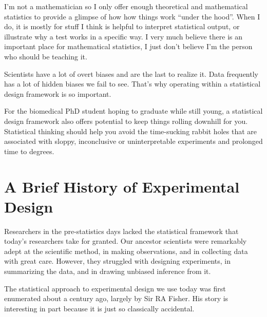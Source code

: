 \documentclass[]{book}
\begin{document}
I'm not a mathematician so I only offer enough theoretical and mathematical statistics to provide a glimpse of how how things work ``under the hood''. When I do, it is mostly for stuff I think is helpful to interpret statistical output, or illustrate why a test works in a specific way. I very much believe there is an important place for mathematical statistics, I just don't believe I'm the person who should be teaching it.

Scientists have a lot of overt biases and are the last to realize it. Data frequently has a lot of hidden biases we fail to see. That's why operating within a statistical design framework is so important.

For the biomedical PhD student hoping to graduate while still young, a statistical design framework also offers potential to keep things rolling downhill for you. Statistical thinking should help you avoid the time-sucking rabbit holes that are associated with sloppy, inconclusive or uninterpretable experiments and prolonged time to degrees.

\hypertarget{history}{%
\chapter{A Brief History of Experimental Design}\label{history}}

Researchers in the pre-statistics days lacked the statistical framework that today's researchers take for granted. Our ancestor scientists were remarkably adept at the scientific method, in making observations, and in collecting data with great care. However, they struggled with designing experiments, in summarizing the data, and in drawing unbiased inference from it.

The statistical approach to experimental design we use today was first enumerated about a century ago, largely by Sir RA Fisher. His story is interesting in part because it is just so classically accidental.
\end{document}
